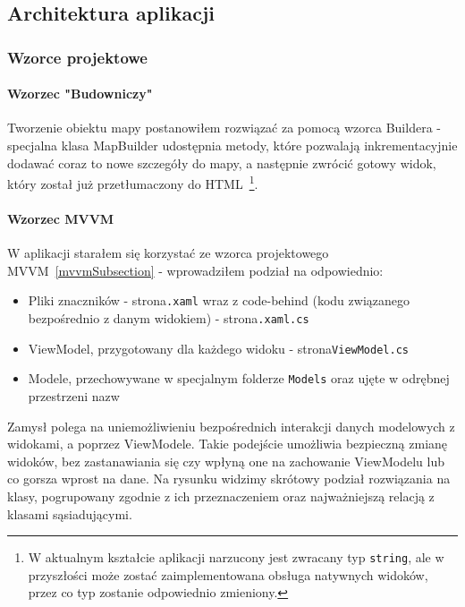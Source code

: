\subsection{Architektura aplikacji}

\subsubsection{Wzorce projektowe}

\paragraph{Wzorzec "Budowniczy"}
Tworzenie obiektu mapy postanowiłem rozwiązać za pomocą wzorca Buildera - 
specjalna klasa MapBuilder udostępnia metody, które pozwalają inkrementacyjnie 
dodawać coraz to nowe szczegóły do mapy, a następnie zwrócić gotowy widok, 
który został już przetłumaczony do HTML~\cprotect\footnote{%
    W aktualnym kształcie aplikacji narzucony jest zwracany typ \verb|string|, 
    ale w przyszłości może zostać zaimplementowana obsługa natywnych widoków,
    przez co typ zostanie odpowiednio zmieniony.}.

\paragraph{Wzorzec MVVM}
W aplikacji starałem się korzystać ze wzorca projektowego MVVM~\ref{mvvmSubsection} - 
wprowadziłem podział na odpowiednio:
\begin{itemize}
    \item Pliki znaczników - strona\verb|.xaml| wraz z code-behind 
    (kodu związanego bezpośrednio z danym widokiem) - strona\verb|.xaml.cs|
    \item ViewModel, przygotowany dla każdego widoku - strona\verb|ViewModel.cs|
    \item Modele, przechowywane w specjalnym folderze \verb|Models| oraz ujęte w odrębnej przestrzeni nazw
\end{itemize}

Zamysł polega na uniemożliwieniu bezpośrednich interakcji danych 
modelowych z widokami, a poprzez ViewModele. Takie podejście umożliwia bezpieczną zmianę 
widoków, bez zastanawiania się czy wpłyną one na zachowanie ViewModelu lub co gorsza wprost na dane.
Na rysunku  widzimy skrótowy podział rozwiązania na klasy, pogrupowany 
zgodnie z ich przeznaczeniem oraz najważniejszą relacją z klasami sąsiadującymi.
\clearpage

